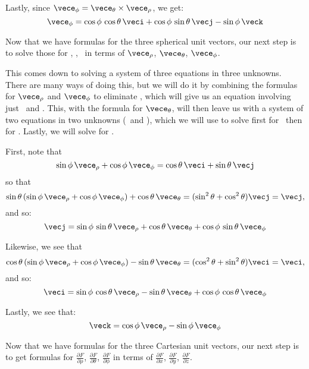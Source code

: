{{Lastly, since $\vece_{\phi}=\vece_{\theta}\times\vece_{\rho}$, we get:
\begin{equation}
 \vece_{\phi} = \cos\phi\,\cos\theta\,\veci + \cos\phi\,\sin\theta\,\vecj - \sin\phi\,\veck
\end{equation}

Now that we have formulas for the three spherical unit vectors, our next step is to solve those for \veci, \vecj, \veck\ in terms of $\vece_{\rho}$, $\vece_{\theta}$, $\vece_{\phi}$.

This comes down to solving a system of three equations in three unknowns. There are many ways of doing this, but we will do it by combining the formulas for $\vece_{\rho}$ and $\vece_{\phi}$ to eliminate \veck, which will give us an equation involving just \veci\ and \vecj. This, with the formula for $\vece_{\theta}$, will then leave us with a system of two equations in two unknowns (\veci\ and \vecj), which we will use to solve first for \vecj\ then for \veci. Lastly, we will solve for \veck.

First, note that
\[
 \sin\phi\,\vece_{\rho} + \cos\phi\,\vece_{\phi} = \cos\theta\,\veci + \sin\theta\,\vecj
\]
so that
\[
 \sin\theta\,(\sin\phi\,\vece_{\rho} + \cos\phi\,\vece_{\phi}) + \cos\theta\,\vece_{\theta} =
  (\sin^2 \theta + \cos^2 \theta)\vecj = \vecj ,
\]
and so:
\begin{equation}\label{j_sphere}
 \vecj = \sin\phi\,\sin\theta\,\vece_{\rho} + \cos\theta\,\vece_{\theta} + \cos\phi\,\sin\theta\,\vece_{\phi}
\end{equation}

Likewise, we see that
\[
 \cos\theta\,(\sin\phi\,\vece_{\rho} + \cos\phi\,\vece_{\phi}) - \sin\theta\,\vece_{\theta} =
  (\cos^2 \theta + \sin^2 \theta)\veci = \veci ,
\]
and so:
\begin{equation}\label{i_sphere}
 \veci = \sin\phi\,\cos\theta\,\vece_{\rho} - \sin\theta\,\vece_{\theta} + \cos\phi\,\cos\theta\,\vece_{\phi}
\end{equation}

Lastly, we see that:
\begin{equation}\label{k_sphere}
 \veck = \cos\phi\,\vece_{\rho} - \sin\phi\,\vece_{\phi}
\end{equation}

Now that we have formulas for the three Cartesian unit vectors, our next step is to get formulas for $\frac{\partial F}{\partial \rho}$, $\frac{\partial F}{\partial \theta}$, $\frac{\partial F}{\partial \phi}$ in terms of $\frac{\partial F}{\partial x}$, $\frac{\partial F}{\partial y}$, $\frac{\partial F}{\partial z}$.

}}
